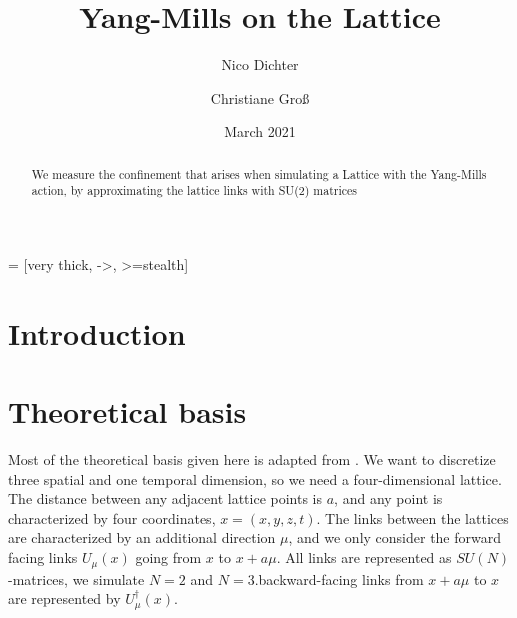 \documentclass[%
 reprint,
 amsmath,amssymb,
 aps,
]{revtex4-1}
\begin{document}
	 = [very thick, ->, >=stealth]

\title{Yang-Mills on the Lattice}%

\author{Nico Dichter}
\author{Christiane Gro\ss{}}


\date{March 2021}%

\begin{abstract}
	We measure the confinement that arises when simulating a Lattice with the Yang-Mills action, by approximating the lattice links with SU(2) matrices
\end{abstract}
\maketitle


\section{Introduction}


\section{Theoretical basis}

Most of the theoretical basis given here is adapted from \citet{lepagelqcd}. We want to discretize three spatial and one temporal dimension, so we need a four-dimensional lattice. The distance between any adjacent lattice points is $a$, and any point is characterized by four coordinates, $x=(x,y,z,t)$. The links between the lattices are characterized by an additional direction $\mu$, and we only consider the forward facing links $U_\mu(x)$ going from $x$ to $x+a\mu$. All links are represented as $SU(N)$-matrices, we simulate $N=2$ and $N=3$.backward-facing links from $x+a\mu$ to $x$ are represented by $U_\mu^\dagger(x)$.
\end{document}
